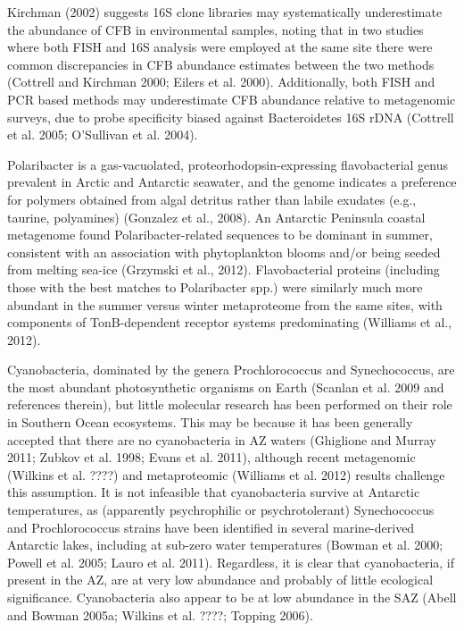 Kirchman (2002) suggests 16S clone libraries may systematically underestimate the abundance of CFB in environmental samples, noting that in two studies where both FISH and 16S analysis were employed at the same site there were common discrepancies in CFB abundance estimates between the two methods (Cottrell and Kirchman 2000; Eilers et al. 2000). Additionally, both FISH and PCR based methods may underestimate CFB abundance relative to metagenomic surveys, due to probe specificity biased against Bacteroidetes 16S rDNA (Cottrell et al. 2005; O'Sullivan et al. 2004).

Polaribacter is a gas-vacuolated, proteorhodopsin-expressing flavobacterial genus prevalent in Arctic and Antarctic seawater, and the genome indicates a preference for polymers obtained from algal detritus rather than labile exudates (e.g., taurine, polyamines) (Gonzalez et al., 2008). An Antarctic Peninsula coastal metagenome found Polaribacter-related sequences to be dominant in summer, consistent with an association with phytoplankton blooms and/or being seeded from melting sea-ice (Grzymski et al., 2012). Flavobacterial proteins (including those with the best matches to Polaribacter spp.) were similarly much more abundant in the summer versus winter metaproteome from the same sites, with components of TonB-dependent receptor systems predominating (Williams et al., 2012). 


Cyanobacteria, dominated by the genera Prochlorococcus and Synechococcus, are the most abundant photosynthetic organisms on Earth (Scanlan et al. 2009 and references therein), but little molecular research has been performed on their role in Southern Ocean ecosystems. This may be because it has been generally accepted that there are no cyanobacteria in AZ waters (Ghiglione and Murray 2011; Zubkov et al. 1998; Evans et al. 2011), although recent metagenomic (Wilkins et al. ????) and metaproteomic (Williams et al. 2012) results challenge this assumption. It is not infeasible that cyanobacteria survive at Antarctic temperatures, as (apparently psychrophilic or psychrotolerant) Synechococcus and Prochlorococcus strains have been identified in several marine-derived Antarctic lakes, including at sub-zero water temperatures (Bowman et al. 2000; Powell et al. 2005; Lauro et al. 2011). Regardless, it is clear that cyanobacteria, if present in the AZ, are at very low abundance and probably of little ecological significance. Cyanobacteria also appear to be at low abundance in the SAZ (Abell and Bowman 2005a; Wilkins et al. ????; Topping 2006).  


